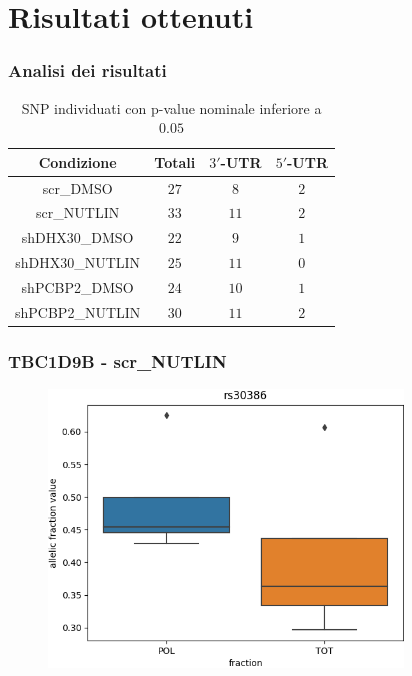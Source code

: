 \documentclass{beamer}
\begin{document}
	\section{Risultati ottenuti}
	\begin{frame}
		\frametitle{Analisi dei risultati}
		\begin{table}[H]
			\begin{tabular}{|c|c|c|c|}
				\hline
				Condizione & Totali & $3'$-UTR & $5'$-UTR\\
				\hline
				scr\_DMSO & $27$ & $8$ & $2$\\
				\hline
				scr\_NUTLIN & $33$ & $11$ &$2$\\
				\hline
				shDHX30\_DMSO & $22$ & $9$ & $1$\\
				\hline
				shDHX30\_NUTLIN & $25$ & $11$ & $0$\\
				\hline
				shPCBP2\_DMSO & $24$ & $10$ & $1$\\
				\hline
				shPCBP2\_NUTLIN & $30$ & $11$ & $2$\\
				\hline
			\end{tabular}
			\caption{SNP individuati con p-value nominale inferiore a $0.05$}
		\end{table}
	\end{frame}
	\begin{frame}
			\frametitle{TBC1D9B - scr\_NUTLIN}
		\begin{figure}
			\includegraphics[width=0.84\textwidth]{media/scr_NUTLIN_rs30386.png}
		\end{figure}
	\end{frame}
\end{document}
